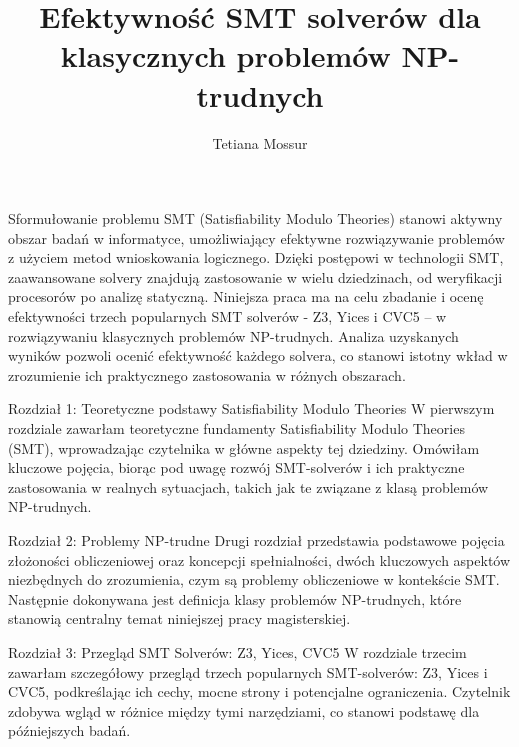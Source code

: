 \documentclass{beamer}
\title{Efektywność SMT solverów dla klasycznych problemów NP-trudnych}
\author{Tetiana Mossur}
\institute[UJD]
{
	Uniwersytet Jana Długosza w Częstochowie \\
	\medskip
}
\date{}
\begin{document}
	
	\begin{frame}
		\titlepage
	\end{frame}


	\begin{frame}{Sformułowanie problemu}
		SMT (Satisfiability Modulo Theories) stanowi aktywny obszar badań w informatyce, umożliwiający efektywne rozwiązywanie problemów z użyciem metod wnioskowania logicznego. Dzięki postępowi  w technologii SMT, zaawansowane solvery znajdują zastosowanie  w wielu dziedzinach, od weryfikacji procesorów po analizę statyczną. 
		Niniejsza praca ma na celu zbadanie i ocenę efektywności trzech popularnych SMT solverów - Z3, Yices i CVC5 –  w rozwiązywaniu klasycznych problemów NP-trudnych. Analiza uzyskanych wyników pozwoli ocenić efektywność każdego solvera,  co stanowi istotny wkład w zrozumienie ich praktycznego zastosowania  w różnych obszarach.
	\end{frame}

	
	\begin{frame}{Rozdział 1: Teoretyczne podstawy Satisfiability Modulo Theories}
		W pierwszym rozdziale zawarłam teoretyczne fundamenty Satisfiability Modulo Theories (SMT), wprowadzając czytelnika  w główne aspekty tej dziedziny. Omówiłam kluczowe pojęcia, biorąc pod uwagę rozwój SMT-solverów i ich praktyczne zastosowania  w realnych sytuacjach, takich jak te związane z klasą problemów NP-trudnych.
	\end{frame}
	
	
	\begin{frame}{Rozdział 2: Problemy NP-trudne}
		Drugi rozdział przedstawia podstawowe pojęcia złożoności obliczeniowej oraz koncepcji spełnialności, dwóch kluczowych aspektów niezbędnych do zrozumienia, czym są problemy obliczeniowe w kontekście SMT. Następnie dokonywana  jest definicja klasy problemów NP-trudnych, które stanowią centralny temat niniejszej pracy magisterskiej.
	\end{frame}
	
	
	\begin{frame}{Rozdział 3: Przegląd SMT Solverów: Z3, Yices, CVC5}
		W rozdziale trzecim zawarłam szczegółowy przegląd trzech popularnych SMT-solverów: Z3, Yices i CVC5, podkreślając  ich cechy, mocne strony i potencjalne ograniczenia. 
		Czytelnik zdobywa wgląd w różnice między tymi narzędziami,  co stanowi podstawę dla późniejszych badań.
	\end{frame}
	
\end{document}

